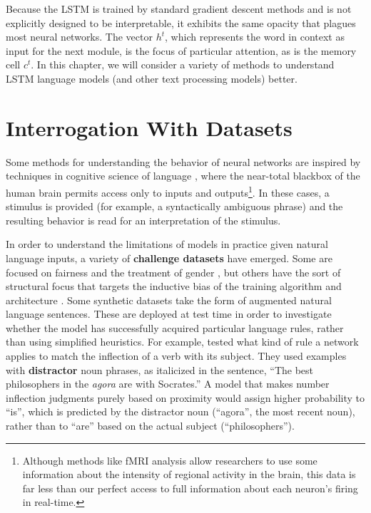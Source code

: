Because the LSTM is trained by standard gradient descent methods and is not explicitly designed to be interpretable, it  exhibits the same opacity that plagues most neural networks. The vector $h^t$, which represents the word in context as input for the next module, is the focus of particular attention, as is the memory cell $c^t$. In this chapter, we will consider a variety of methods to  understand LSTM language models (and other text processing models) better.

\section{Interrogation With Datasets} \label{sec:interrogation_data_sets}

Some methods for understanding the behavior of neural networks are inspired by techniques in cognitive science of language \citep{bock_syntactic_1986,miller1963finitary,macdonald1994lexical,futrell2017noisy}, where the near-total blackbox of the human brain permits access only to inputs and outputs\footnote{Although methods like fMRI analysis allow researchers to use some information about the intensity of regional activity in the brain, this data is far less than our perfect access to full information about each neuron's firing in real-time.}. In these cases, a stimulus is provided (for example, a syntactically ambiguous phrase) and the resulting behavior is read for an interpretation of the stimulus.

In order to understand the limitations of models in practice given natural language inputs, a variety of \textbf{challenge datasets} have emerged. Some are focused on fairness and the treatment of gender \citep{Rudinger2018GenderBI}, but others have the sort of structural focus that targets the inductive bias of the training algorithm and architecture \citep{emelin-etal-2020-detecting,linzen_assessing_2016,futrell_rnns_2018}. Some synthetic datasets take the form of augmented natural language sentences. These are deployed at test time in order to investigate whether the model has successfully acquired particular language rules, rather than using simplified heuristics. For example, \citet{linzen_assessing_2016} tested what kind of rule a network applies to match the inflection of a verb with its subject. They used examples with \textbf{distractor} noun phrases, as italicized in the sentence, ``The best philosophers in the \textit{agora} are with Socrates.'' A model that makes number inflection judgments purely based on proximity would assign higher probability to ``is'', which is predicted by the distractor noun (``agora'', the most recent noun), rather than to ``are'' based on the actual subject (``philosophers'').


